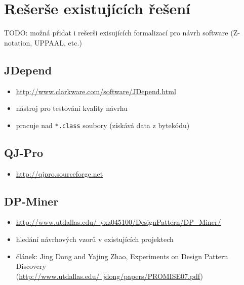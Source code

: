 \section{Rešerše existujících řešení}

TODO: možná přidat i rešerši exisujících formalizací pro návrh software (Z-notation, UPPAAL, etc.)

\label{requirements-existing_tools}

\subsection{JDepend}

\begin{itemize}
\item \href{http://www.clarkware.com/software/JDepend.html}{http://www.clarkware.com/software/JDepend.html}
\item nástroj pro testování kvality návrhu
\item pracuje nad \verb+*.class+ soubory (získává data z bytekódu)
\end{itemize}

\subsection{QJ-Pro}
\begin{itemize}
\item \href{http://qjpro.sourceforge.net}{http://qjpro.sourceforge.net}
\end{itemize}

\subsection{DP-Miner}
\begin{itemize}
\item \href{http://www.utdallas.edu/~yxz045100/DesignPattern/DP\_Miner/}{http://www.utdallas.edu/~yxz045100/DesignPattern/DP\_Miner/}
\item hledání návrhových vzorů v existujících projektech
\item článek: Jing Dong and Yajing Zhao, Experiments on Design Pattern Discovery \\ (\href{http://www.utdallas.edu/~jdong/papers/PROMISE07.pdf}{http://www.utdallas.edu/~jdong/papers/PROMISE07.pdf})
\end{itemize}

